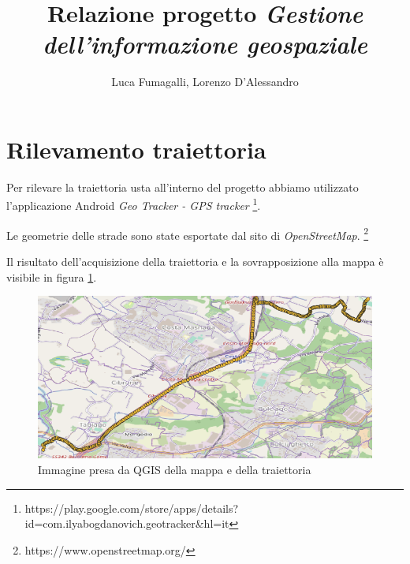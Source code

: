 \documentclass[12pt]{report}
\begin{document}
	\author{Luca Fumagalli, Lorenzo D'Alessandro}
	\title{Relazione progetto \textit{Gestione dell’informazione geospaziale} }
	\date{\vspace{-5ex}}
	\maketitle

\chapter*{Rilevamento traiettoria}
Per rilevare la traiettoria usta all'interno del progetto abbiamo utilizzato l'applicazione Android \textit{Geo Tracker - GPS tracker}%
\footnote{https://play.google.com/store/apps/details?id=com.ilyabogdanovich.geotracker\&hl=it}.

Le geometrie delle strade sono state esportate dal sito di \textit{OpenStreetMap}.%
\footnote{https://www.openstreetmap.org/}

Il risultato dell'acquisizione della traiettoria e la sovrapposizione alla mappa è visibile in figura \ref{punto1}.
\begin{figure}
	\centering
	\includegraphics[scale = 0.55]{figures/punto1}
	\caption{Immagine presa da QGIS della mappa e della traiettoria}\label{punto1}
\end{figure}
\end{document}
